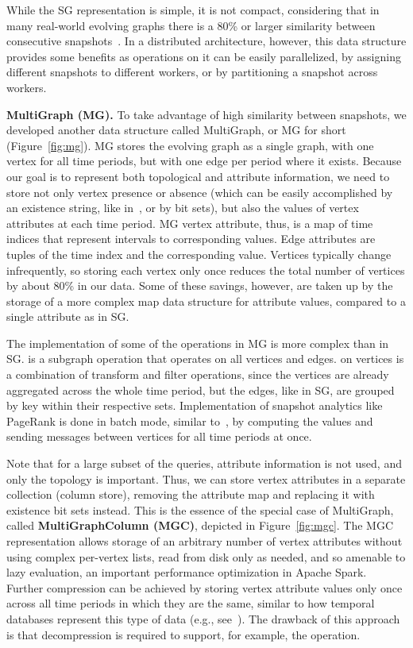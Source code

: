 While the SG representation is simple, it is not compact, considering
that in many real-world evolving graphs there is a 80\% or larger
similarity between consecutive
snapshots~\cite{DBLP:journals/tos/MiaoHLWYZPCC15}.  In a distributed
architecture, however, this data structure provides some benefits as
operations on it can be easily parallelized, by assigning different
snapshots to different workers, or by partitioning a snapshot across
workers.  

{\bf MultiGraph (MG).}  To take advantage of high similarity between
snapshots, we developed another data structure called MultiGraph, or
MG for short (Figure~\ref{fig:mg}).  MG stores the evolving graph as a
single graph, with one vertex for all time periods, but with one edge
per period where it exists.  Because our goal is to represent both
topological and attribute information, we need to store not only
vertex presence or absence (which can be easily accomplished by an
existence string, like in~\cite{Kan2009}, or by bit sets), but also
the values of vertex attributes at each time period.  MG vertex
attribute, thus, is a map of time indices that represent intervals to
corresponding values.  Edge attributes are tuples of the time index
and the corresponding value.  Vertices typically change infrequently,
so storing each vertex only once reduces the total number of vertices
by about 80\% in our data.  Some of these savings, however, are taken
up by the storage of a more complex map data structure for attribute
values, compared to a single attribute as in SG.  

The implementation of some of the \ql operations in MG is more complex
than in SG.   is a subgraph operation that operates on
all vertices and edges.   on vertices is a combination
of transform and filter operations, since the vertices are already
aggregated across the whole time period, but the edges, like in SG,
are grouped by key within their respective sets.  Implementation of
snapshot analytics like PageRank is done in batch mode, similar
to~\cite{DBLP:journals/tos/MiaoHLWYZPCC15}, by computing the values
and sending messages between vertices for all time periods at once.

Note that for a large subset of the queries, attribute information is
not used, and only the topology is important.  Thus, we can store
vertex attributes in a separate collection (column store), removing
the attribute map and replacing it with existence bit sets instead.
This is the essence of the special case of MultiGraph, called {\bf
  MultiGraphColumn (MGC)}, depicted in Figure~\ref{fig:mgc}.  The MGC
representation allows storage of an arbitrary number of vertex
attributes without using complex per-vertex lists, read from disk only
as needed, and so amenable to lazy evaluation, an important
performance optimization in Apache Spark.  Further compression can be
achieved by storing vertex attribute values only once across all time
periods in which they are the same, similar to how temporal databases
represent this type of data (e.g., see~\cite{Muller2008}).  The
drawback of this approach is that decompression is required to
support, for example, the  operation.

